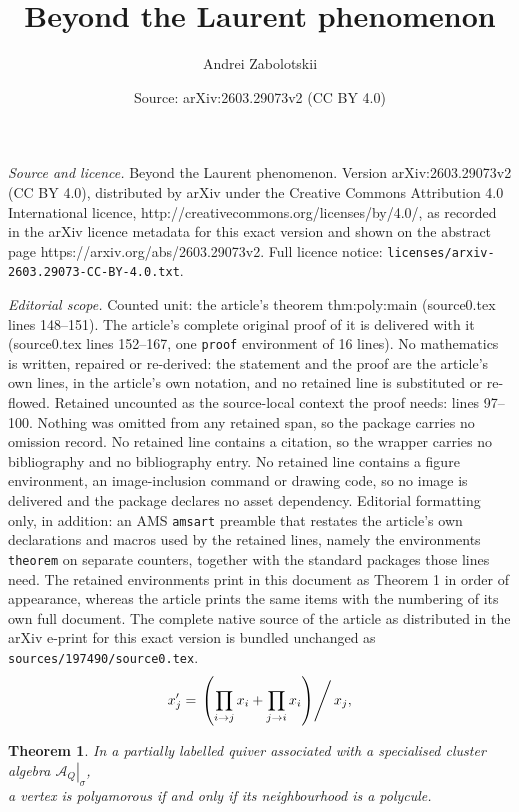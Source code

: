 \documentclass[10pt,a4paper]{amsart}
\title{Beyond the Laurent phenomenon}
\author{Andrei Zabolotskii}
\date{Source: arXiv:2603.29073v2 (CC BY 4.0)}
\newtheorem{theorem}{Theorem}
\newcommand{\sA}{\left.\mathcal{A}_Q\right|_\sigma}
\begin{document}
\maketitle

\noindent\emph{Source and licence.} Beyond the Laurent phenomenon. Version arXiv:2603.29073v2 (CC BY 4.0), distributed by arXiv under the Creative Commons Attribution 4.0 International licence, http://creativecommons.org/licenses/by/4.0/, as recorded in the arXiv licence metadata for this exact version and shown on the abstract page https://arxiv.org/abs/2603.29073v2. Full licence notice: \texttt{licenses/arxiv-2603.29073-CC-BY-4.0.txt}.\par\smallskip

\noindent\textit{Editorial scope.} Counted unit: the article's theorem thm:poly:main (source0.tex lines 148--151). The article's complete original proof of it is delivered with it (source0.tex lines 152--167, one \texttt{proof} environment of 16 lines). No mathematics is written, repaired or re-derived: the statement and the proof are the article's own lines, in the article's own notation, and no retained line is substituted or re-flowed.  Retained uncounted as the source-local context the proof needs: lines 97--100.  Nothing was omitted from any retained span, so the package carries no omission record.  No retained line contains a citation, so the wrapper carries no bibliography and no bibliography entry.  No retained line contains a figure environment, an image-inclusion command or drawing code, so no image is delivered and the package declares no asset dependency.  Editorial formatting only, in addition: an AMS \texttt{amsart} preamble that restates the article's own declarations and macros used by the retained lines, namely the environments \texttt{theorem} on separate counters, together with the standard packages those lines need.  The retained environments print in this document as Theorem 1 in order of appearance, whereas the article prints the same items with the numbering of its own full document.  The complete native source of the article as distributed in the arXiv e-print for this exact version is bundled unchanged as \texttt{sources/197490/source0.tex}.
\begin{equation}
\label{eq:mut}
x_j' = \left.\left( \prod_{i\to j}x_i + \prod_{j\to i} x_i \right)\right/x_j,
\end{equation}

\begin{theorem}
\label{thm:poly:main}
In a partially labelled quiver associated with a specialised cluster algebra $\sA$, \\ a vertex is polyamorous if and only if its neighbourhood is a polycule.
\end{theorem}
\end{document}

